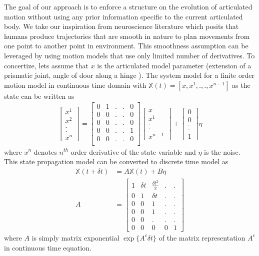 \documentclass[conference]{IEEEtran}
\begin{document}
The goal of our approach is to enforce a structure on the evolution of articulated motion without using any prior information specific to the current articulated body. We take our inspiration from neuroscience literature which posits that humans produce trajectories that are smooth in nature \cite{flash1985coordination} to plan movements from one point to another point in environment. This smoothness assumption can be leveraged by using motion models that use only limited number of derivatives. To concertize, lets assume that $x$ is the articulated model parameter (extension of a prismatic joint, angle of door along a hinge ). The system model for a finite order motion model in continuous time domain with $\mathbb{X}(t) = [x,x^{1},.,.,x^{n-1}]$ as the state can be written as
\begin{align}
\begin{bmatrix}
x^{1} \\
x^{2} \\
. \\
.\\
x^{n}
\end{bmatrix} = 
\begin{bmatrix}
0 & 1  & . & . & 0\\
0 & 0  & . & . & 0\\
0 & 0  & . & . & 0\\
0& 0 & . & . & 1\\
0 & 0  & . & . & 0\\
\end{bmatrix}
\begin{bmatrix}
x \\
x^{1} \\
. \\
.\\
x^{n-1}
\end{bmatrix}
+\begin{bmatrix}
0 \\
0 \\
.\\
.\\
1
\end{bmatrix} \eta
\end{align}
where $x^{n}$ denotes $n^{th}$ order derivative of the state variable and $\eta$ is the noise. This state propagation model can be converted to discrete time model as 
\begin{align}
\mathbb{X}(t+\delta t)& = A \mathbb{X}(t) + B \eta\\
A& = 
\begin{bmatrix}
 1 & \delta  t & \frac{{\delta  t}^2}{2} &  . & . \\
0 & 1 & \delta  t &  . & . \\
0 & 0 & 1  &  . & . \\
0 & 0 & 1  &  . & . \\
0 & 0 & .  &  . & . \\
0&  0&    0 &     0 &    1
\end{bmatrix}
\end{align}
where $A$ is simply matrix exponential $\exp\{A^c\delta t\}$ of the matrix representation $A^c$  in continuous time equation.
\end{document}
